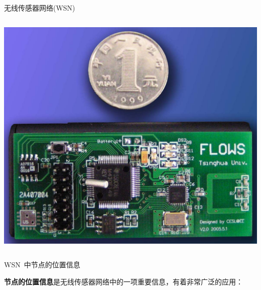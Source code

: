 \documentclass[mathserif,compress,CJKutf8, red]{beamer}
\begin{document}
\begin{CJK*}{UTF8}{song}
\begin{frame}{无线传感器网络(WSN)}
\begin{columns}
\begin{column}{0.3\textwidth}
   \includegraphics[width=\textwidth]{images/flows3.jpg}
  \end{column}
\end{columns}
\end{frame}

\begin{frame}{WSN~中节点的位置信息}

\textbf{节点的位置信息}是无线传感器网络中的一项重要信息，有着非常广泛的应用：


\end{frame}
\end{CJK*}
\end{document}
